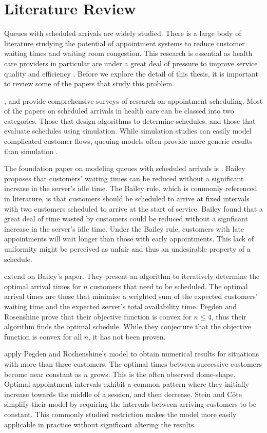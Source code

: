 \chapter{Literature Review}
Queues with scheduled arrivals are widely studied. There is a large body of literature studying the potential of appointment systems to reduce customer waiting times and waiting room congestion. This research is essential as health care providers in particular are under a great deal of pressure to improve service quality and efficiency \citep{Goldsmith}.  Before we explore the detail of this thesis, it is important to review some of the papers that study this problem.

\citet{Fomundam}, and \citet{Cayirli} provide comprehensive surveys of research on appointment scheduling. Most of the papers on scheduled arrivals in health care can be classed into two categories. Those that design algorithms to determine schedules, and those that evaluate schedules using simulation. While simulation studies can easily model complicated customer flows, queuing models often provide more generic results than simulation \citep{Green}.

The foundation paper on modeling queues with scheduled arrivals is \citet{Bailey}. Bailey proposes that customers' waiting times can be reduced without a significant increase in the server's idle time. The Bailey rule, which is commonly referenced in literature, is that customers should be scheduled to arrive at fixed intervals with two customers scheduled to arrive at the start of service. Bailey found that a great deal of time wasted by customers could be reduced without a signficant increase in the server's idle time. Under the Bailey rule, customers with late appointments will wait longer than those with early appointments. This lack of uniformity might be perceived as unfair and thus an undesirable property of a schedule. 

\citet{Pegden} extend on Bailey's paper. They present an algorithm to iteratively determine the optimal arrival times for $n$ customers that need to be scheduled. The optimal arrival times are those that minimise a weighted sum of the expected customers' waiting time and the expected server's total availability time. Pegden and Rosenshine prove that their objective function is convex for $n \leq 4$, thus their algorithm finds the optimal schedule. While they conjecture that the objective function is convex for all $n$, it has not been proven.

\citet{Stein} apply Pegden and Roshenshine's model to obtain numerical results for situations with more than three customers. The optimal times between successive customers become near constant as $n$ grows. This is the often observed dome-shape. Optimal appointment intervals exhibit a common pattern where they initially increase towards the middle of a session, and then decrease. Stein and C\^{o}te simplify their model by requiring the intervals between arriving customers to be constant. This commonly studied restriction makes the model more easily applicable in practice without significant altering the results.

